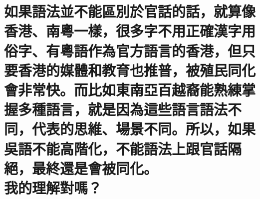 %

\chapter[如果語法並不能區別於官話的話，就算像香港、南粵一樣，很多字不用正確漢字用俗字、有粵語作為官方語言的香港，但只要香港的媒體和教育也推普，被殖民同化會非常快。而比如東南亞百越裔能熟練掌握多種語言，就是因為這些語言語法不同，代表的思維、場景不同。所以，如果吳語不能高階化，不能語法上跟官話隔絕，最終還是會被同化。 我的理解對嗎？]{如果語法並不能區別於官話的話，就算像香港、南粵一樣，很多字不用正確漢字用俗字、有粵語作為官方語言的香港，但只要香港的媒體和教育也推普，被殖民同化會非常快。而比如東南亞百越裔能熟練掌握多種語言，就是因為這些語言語法不同，代表的思維、場景不同。所以，如果吳語不能高階化，不能語法上跟官話隔絕，最終還是會被同化。 \\[0.35em] 我的理解對嗎？}

